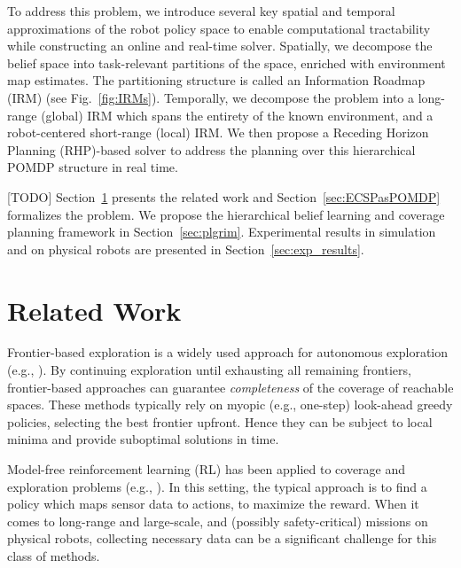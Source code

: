 \documentclass[letterpaper]{article} %
\newcommand{\phdone}[1]{} %
\begin{document}
\phdone{Contributions}
To address this problem, we introduce several key spatial and temporal approximations of the robot policy space to enable computational tractability while constructing an online and real-time solver.
Spatially, we decompose the belief space into task-relevant partitions of the space,
enriched with environment map estimates. %
The partitioning structure is called an Information Roadmap (IRM) (see Fig.~\ref{fig:IRMs}). Temporally, we decompose the problem into a long-range (global) IRM which spans the entirety of the known environment, and a robot-centered short-range (local) IRM. %
We then propose a Receding Horizon Planning (RHP)-based solver to address the planning over this hierarchical POMDP structure %
in real time.

\phdone{Outline}
[TODO] Section~\ref{sec:related_work} presents the related work and Section~\ref{sec:ECSPasPOMDP} formalizes the problem.
We propose the hierarchical belief learning and coverage planning framework in Section~\ref{sec:plgrim}. Experimental results in simulation and on physical robots are presented in Section~\ref{sec:exp_results}.%


\section{Related Work}\label{sec:related_work}
\phdone{Coverage--Frontier-based exploration}
Frontier-based exploration is a widely used approach for autonomous exploration (e.g., \cite{yamauchi1997frontier,tao2007motion,keidar2012robot,heng2015efficient,gonzalez2002navigation,grabowski2003autonomous}). By continuing exploration until exhausting all remaining frontiers, frontier-based approaches can guarantee \textit{completeness} of the coverage of reachable spaces.  These methods typically rely on myopic (e.g., one-step) look-ahead greedy policies, selecting the best frontier upfront. Hence they can be subject to local minima and provide suboptimal solutions in time.

\phdone{Coverage--(Model-free) RL-based approaches}
Model-free reinforcement learning (RL) has been applied to coverage and exploration problems (e.g., \cite{pathak_icm, rnd,burda2018study,ECR2018}). In this setting, the typical approach is to find a policy which maps sensor data to actions, to maximize the reward. When it comes to long-range and large-scale, and (possibly safety-critical) missions on physical robots, collecting necessary data can be a significant challenge for this class of methods.
\end{document}
